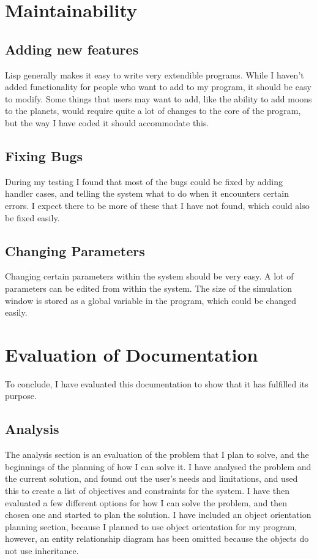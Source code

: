 \section{Maintainability}
\subsection{Adding new features}
Lisp generally makes it easy to write very extendible programs. While I haven't
added functionality for people who want to add to my program, it should be easy
to modify. Some things that users may want to add, like the ability to add moons
to the planets, would require quite a lot of changes to the core of the program,
but the way I have coded it should accommodate this.

\subsection{Fixing Bugs}
During my testing I found that most of the bugs could be fixed by adding handler
cases, and telling the system what to do when it encounters certain errors. I
expect there to be more of these that I have not found, which could also be
fixed easily.

\subsection{Changing Parameters}
Changing certain parameters within the system should be very easy. A lot of
parameters can be edited from within the system. The size of the simulation
window is stored as a global variable in the program, which could be changed
easily.

\section{Evaluation of Documentation}
To conclude, I have evaluated this documentation to show that it has fulfilled
its purpose.
\subsection{Analysis}
The analysis section is an evaluation of the problem that I plan to solve, and
the beginnings of the planning of how I can solve it. I have analysed the
problem and the current solution, and found out the user's needs and
limitations, and used this to create a list of objectives and constraints for
the system. I have then evaluated a few different options for how I can solve
the problem, and then chosen one and started to plan the solution. I have
included an object orientation planning section, because I planned to use object
orientation for my program, however, an entity relationship diagram has been
omitted because the objects do not use inheritance.
